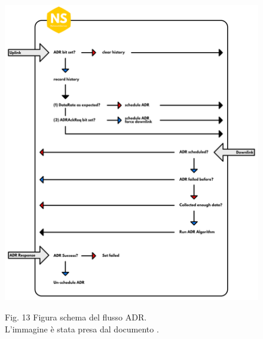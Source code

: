 \documentclass[a4paper]{report} %
\begin{document}
\begin{figure}
\centering
\includegraphics[scale=.5]{Immagini/adr.png}

Fig. 13 Figura schema del flusso ADR.\\
L'immagine è stata presa dal documento \cite{art:rif.32}.\\
\end{figure}
\end{document}
